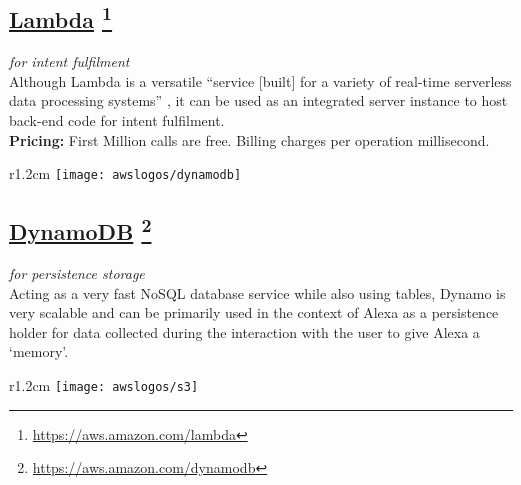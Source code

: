 \subsection*{
	\href{https://aws.amazon.com/lambda/}{\textbf{Lambda}} \footnote{\url{https://aws.amazon.com/lambda}}
}
	\textit{for intent fulfilment}\\
	Although Lambda is a versatile ``service [built] for a variety of real-time serverless data processing systems'' \cite{aws_website}, it can be used as an integrated server instance to host back-end code for intent fulfilment.\\	 %
	\textbf{Pricing:} First Million calls are free. Billing charges per operation millisecond.

	



\begin{wrapfigure}[2]{r}{1.2cm}
	\texttt{[image: awslogos/dynamodb]}
\end{wrapfigure}

%


\subsection*{
\href{https://aws.amazon.com/dynamodb/}{\textbf{DynamoDB}} \footnote{\url{https://aws.amazon.com/dynamodb}}
}
\textit{for persistence storage}\\
Acting as a very fast NoSQL database service while also using tables,
Dynamo is very scalable and can be primarily used in the context of Alexa as a persistence holder for data collected during the interaction with the user to give Alexa a `memory'.



\begin{wrapfigure}[2]{r}{1.2cm}
	\texttt{[image: awslogos/s3]}
\end{wrapfigure}

%

